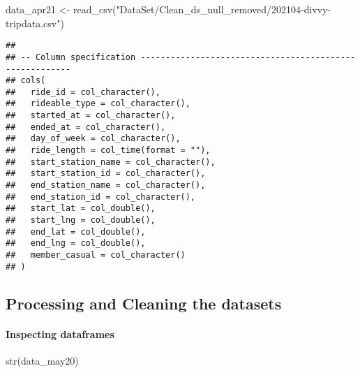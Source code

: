 \documentclass[
]{article}
\newenvironment{Shaded}{\begin{snugshade}}{\end{snugshade}}
\newcommand{\FunctionTok}[1]{\textcolor[rgb]{0.00,0.00,0.00}{#1}}
\newcommand{\NormalTok}[1]{#1}
\newcommand{\OtherTok}[1]{\textcolor[rgb]{0.56,0.35,0.01}{#1}}
\newcommand{\StringTok}[1]{\textcolor[rgb]{0.31,0.60,0.02}{#1}}
\begin{document}
\begin{Shaded}
\begin{Highlighting}[]
\NormalTok{data\_apr21 }\OtherTok{\textless{}{-}} \FunctionTok{read\_csv}\NormalTok{(}\StringTok{"DataSet/Clean\_ds\_null\_removed/202104{-}divvy{-}tripdata.csv"}\NormalTok{)}
\end{Highlighting}
\end{Shaded}

\begin{verbatim}
## 
## -- Column specification --------------------------------------------------------
## cols(
##   ride_id = col_character(),
##   rideable_type = col_character(),
##   started_at = col_character(),
##   ended_at = col_character(),
##   day_of_week = col_character(),
##   ride_length = col_time(format = ""),
##   start_station_name = col_character(),
##   start_station_id = col_character(),
##   end_station_name = col_character(),
##   end_station_id = col_character(),
##   start_lat = col_double(),
##   start_lng = col_double(),
##   end_lat = col_double(),
##   end_lng = col_double(),
##   member_casual = col_character()
## )
\end{verbatim}

\hypertarget{processing-and-cleaning-the-datasets}{%
\subsection{Processing and Cleaning the
datasets}\label{processing-and-cleaning-the-datasets}}

\hypertarget{inspecting-dataframes}{%
\paragraph{Inspecting dataframes}\label{inspecting-dataframes}}

\begin{Shaded}
\begin{Highlighting}[]
\FunctionTok{str}\NormalTok{(data\_may20)}
\end{Highlighting}
\end{Shaded}
\end{document}
